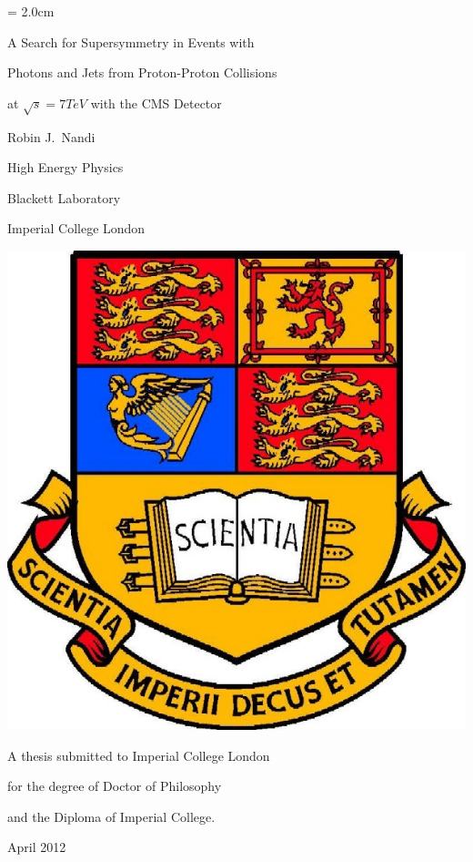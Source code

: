 \begin{titlepage}
\topmargin = 2.0cm
\begin{center}
{\bf 
\centerline{\Large A Search for Supersymmetry in Events with}
\centerline{\Large Photons and Jets from Proton-Proton Collisions}
\centerline{\Large at $\sqrt{s} = 7 \unit{TeV}$ with the CMS Detector}}
\vspace{1.3cm}
\centerline{\Large Robin J.\ Nandi}
\vspace{0.8cm}
\centerline{\large High Energy Physics}
\centerline{\large Blackett Laboratory}
\centerline{\large Imperial College London}
\vspace{1.0cm}
\includegraphics[scale=0.3]{title/ICcrest.jpg} \\
\vspace{1.0cm}
\centerline{\large A thesis submitted to Imperial College London}
\centerline{\large for the degree of Doctor of Philosophy}
\centerline{\large and the Diploma of Imperial College.}
\vspace{0.5cm}
\centerline{\large April 2012}
\end{center}
\end{titlepage}
